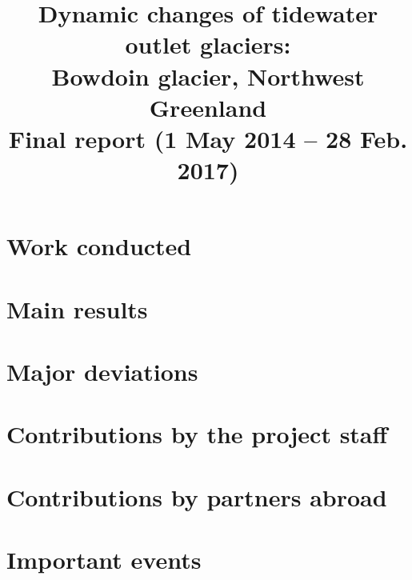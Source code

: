 \documentclass{article}
\title{Dynamic changes of tidewater outlet glaciers:\\
       Bowdoin glacier, Northwest Greenland\\\bigskip
       \large Final report (1 May 2014 -- 28 Feb. 2017)}
\date{}
\begin{document}

\maketitle

\section{Work conducted}
\section{Main results}
\section{Major deviations}
\section{Contributions by the project staff}
\section{Contributions by partners abroad}
\section{Important events}

\end{document}
